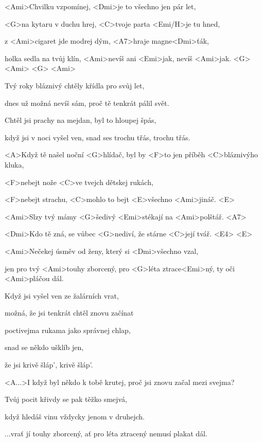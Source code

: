 


\zs
<Ami>Chvilku vzpomínej, <Dmi>je to všechno jen pár let,

<G>na kytaru v duchu hrej, <C>tvoje parta <Emi/H>je tu hned,

z <Ami>cigaret jde modrej dým, <A7>hraje magne<Dmi>ťák,

holka sedla na tvůj klín, <Ami>nevíš ani <Emi>jak,
nevíš <Ami>jak. <G> <Ami> <G> <Ami>
\ks

\zs
Tvý roky bláznivý chtěly křídla pro svůj let,

dnes už možná nevíš sám, proč tě tenkrát pálil svět.

Chtěl jsi prachy na mejdan, byl to hloupej špás,

když jsi v noci vyšel ven, snad ses trochu třás, trochu třás.
\ks

\zs
<A>Když tě našel noční <G>hlídač, byl by <F>to jen příběh 
<C>bláznivýho kluka,

<F>nebejt nože <C>ve tvejch dětskej rukách,

<F>nebejt strachu, <C>mohlo to bejt <E>všechno <Ami>jináč. 
<E>
\ks

\zr
<Ami>Slzy tvý mámy <G>šedivý <Emi>stékají na <Ami>polštář. <A7>


<Dmi>Kdo tě zná, se vůbec <G>nediví, že stárne <C>její tvář.
<E4> <E>

<Ami>Nečekej úsměv od ženy, který si <Dmi>všechno vzal,

jen pro tvý <Ami>touhy zborcený, pro <G>léta ztrace<Emi>ný, ty 
oči <Ami>pláčou dál.
\kr

\zs
Když jsi vyšel ven ze žalárních vrat,

možná, že jsi tenkrát chtěl znovu začínat

poctivejma rukama jako správnej chlap,

snad se někdo ušklíb jen,

že jsi krivě šláp', krivě šláp'.
\ks

\zs
<A...>I když byl někdo k tobě krutej, proč jsi znovu začal mezi svejma?

Tvůj pocit křivdy se pak těžko smejvá,

když hledáš vinu vždycky jenom v druhejch.
\ks

\zr
...vrať jí touhy zborcený, ať pro léta ztracený nemusí plakat dál.
\kr


\kp
